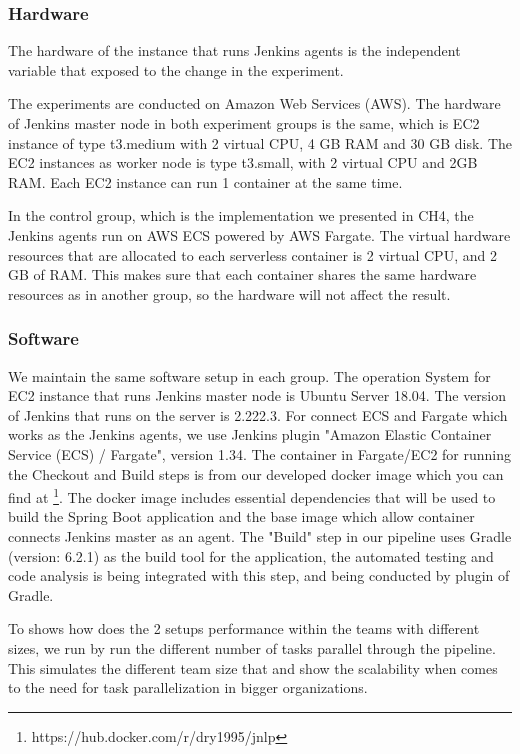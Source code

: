 \subsubsection{Hardware}
The hardware of the instance that runs Jenkins agents is the independent variable that exposed to the change in the experiment.
\par
The experiments are conducted on Amazon Web Services (AWS). The hardware of Jenkins master node in both experiment groups is the same, which is EC2 instance of type t3.medium with 2 virtual CPU, 4 GB RAM and 30 GB disk. The EC2 instances as worker node is type t3.small, with 2 virtual CPU and 2GB RAM. Each EC2 instance can run 1 container at the same time.
\par
In the control group, which is the implementation we presented in CH4, the Jenkins agents run on AWS ECS powered by AWS Fargate. The virtual hardware resources that are allocated to each serverless container is 2 virtual CPU, and 2 GB of RAM. This makes sure that each container shares the same hardware resources as in another group, so the hardware will not affect the result.
\subsubsection{Software}
We maintain the same software setup in each group. The operation System for EC2 instance that runs Jenkins master node is Ubuntu Server 18.04. The version of Jenkins that runs on the server is 2.222.3. For connect ECS and Fargate which works as the Jenkins agents, we use Jenkins plugin "Amazon Elastic Container Service (ECS) / Fargate", version 1.34. The container in Fargate/EC2 for running the Checkout and Build steps is from our developed docker image which you can find at \footnote{https://hub.docker.com/r/dry1995/jnlp}. The docker image includes essential dependencies that will be used to build the Spring Boot application and the base image which allow container connects Jenkins master as an agent. The "Build" step in our pipeline uses Gradle (version: 6.2.1) as the build tool for the application, the automated testing and code analysis is being integrated with this step, and being conducted by plugin of Gradle.

\par
To shows how does the 2 setups performance within the teams with different sizes, we run by run the different number of tasks parallel through the pipeline. This simulates the different team size that  and show the scalability when comes to the need for task parallelization in bigger organizations.

